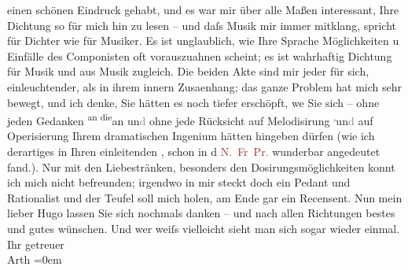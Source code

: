                einen schönen Eindruck gehabt, und es war mir über alle Maßen interessant, Ihre
               Dichtung so für mich hin zu lesen – und daſs Musik mir immer mitklang, spricht für
               Dichter wie für Musiker. Es ist unglaublich, wie Ihre Sprache Möglichkeiten u
               Einfälle des Componisten oft vorauszuahnen scheint; es ist wahrhaftig Dichtung für
               Musik und aus Musik zugleich. Die beiden Akte sind mir {\pb}jeder für sich, einleuchtender, als in ihrem innern Zusa{\geminationm}enhang; das ganze Problem hat mich sehr bewegt, und ich
               denke, Sie hätten es noch tiefer erschöpft, we{\geminationn} Sie sich
               – ohne jeden Gedanken \substVorne{}\textsuperscript{an die}{\allowbreak}\substDazwischen{}an\substHinten{} un\textcolor{gray}{d} ohne jede Rücksicht auf Melodisirung \substVorne{}\textsuperscript{,}\substDazwischen{}un\textcolor{gray}{d}\substHinten{} auf Operisierung Ihrem dramatischen Ingenium hätten hingeben dürfen (wie ich
               derartiges in Ihren einleitenden \label{K_L02504_2v}\label{K_L02504_2h}, schon in d \textcolor{brown}{N. Fr Pr.}{}\ledrightnote{\textcolor{brown}{Neue Freie Presse}}
               wunderbar angedeutet fand.). Nur mit den Liebestränken, besonders den
               Dosirungsmöglichkeiten konnt ich mich nicht befreunden; irgendwo in mir steckt doch
               ein Pedant und Rationalist und der Teufel soll mich holen, am Ende gar ein
               Recensent.\pend
           \pstart
           Nun mein lieber Hugo lassen Sie sich nochmals danken – und nach allen Richtungen
               bestes und gutes wünschen. Und wer weiſs vielleicht sieht man sich sogar wieder
               einmal.{\\[\baselineskip]}Ihr getreuer{\\[\baselineskip]}\spacefill\mbox{Arth}\pend
           \leftskip=0em{}\endnumbering{}  
      